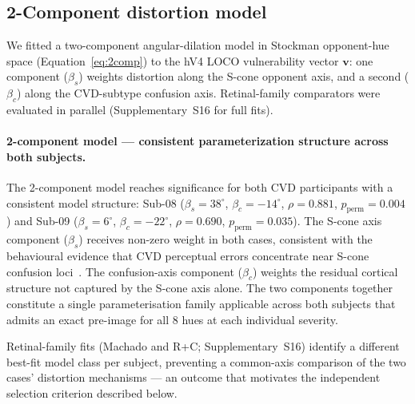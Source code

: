 \subsection{2-Component distortion model}
\label{sec:results:inference}

We fitted a two-component angular-dilation model in Stockman opponent-hue
space (Equation~\ref{eq:2comp}) to the hV4 LOCO vulnerability vector
$\mathbf{v}$: one component ($\beta_s$) weights distortion along the
S-cone opponent axis, and a second ($\beta_c$) along the CVD-subtype
confusion axis. Retinal-family comparators were evaluated in parallel
(Supplementary~S16 for full fits).

\paragraph{2-component model --- consistent parameterization structure across both subjects.}
The 2-component model reaches significance for both CVD participants with a
consistent model structure: Sub-08 ($\beta_s = 38^\circ$, $\beta_c =
-14^\circ$, $\rho = 0.881$, $p_{\text{perm}} = 0.004$) and Sub-09
($\beta_s = 6^\circ$, $\beta_c = -22^\circ$, $\rho = 0.690$,
$p_{\text{perm}} = 0.035$). The S-cone axis component ($\beta_s$) receives
non-zero weight in both cases, consistent with the behavioural evidence that
CVD perceptual errors concentrate near S-cone confusion
loci~\cite{emery2021}. The confusion-axis component ($\beta_c$) weights
the residual cortical structure not captured by the S-cone axis alone. The two components
together constitute a single parameterisation family applicable across
both subjects that admits an exact pre-image for all 8 hues at each
individual severity.

Retinal-family fits (Machado and R+C; Supplementary~S16) identify a
different best-fit model class per subject, preventing a common-axis
comparison of the two cases' distortion mechanisms --- an outcome that
motivates the independent selection criterion described below.

